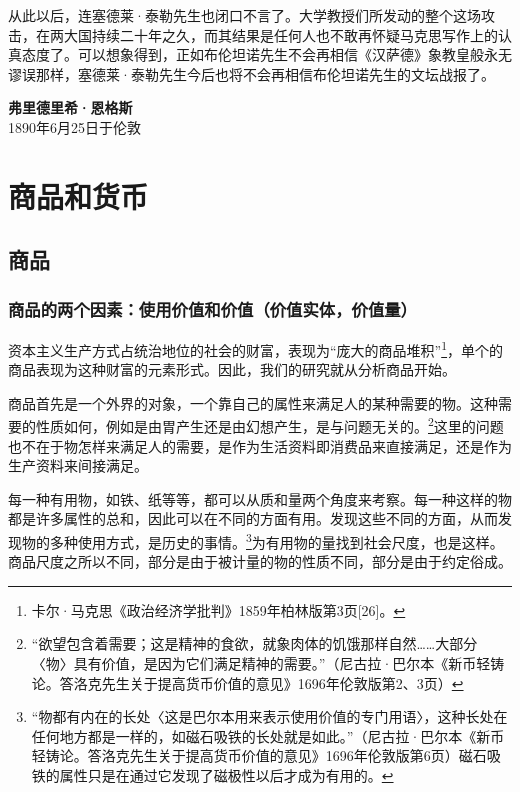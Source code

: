 \documentclass{ctexbook}
\begin{document}
从此以后，连塞德莱·泰勒先生也闭口不言了。大学教授们所发动的整个这场攻击，在两大国持续二十年之久，而其结果是任何人也不敢再怀疑马克思写作上的认真态度了。可以想象得到，正如布伦坦诺先生不会再相信《汉萨德》象教皇般永无谬误那样，塞德莱·泰勒先生今后也将不会再相信布伦坦诺先生的文坛战报了。



\begin{flushright}
    \textbf{弗里德里希·恩格斯}\\
    \small{1890年6月25日于伦敦}
\end{flushright}







\mainmatter

\part{商品和货币}
\thispagestyle{empty}

\chapter{商品}

    \section{商品的两个因素：使用价值和价值（价值实体，价值量）}

    资本主义生产方式占统治地位的社会的财富，表现为“庞大的商品堆积”\footnote{卡尔·马克思《政治经济学批判》1859年柏林版第3页[26]。}，单个的商品表现为这种财富的元素形式。因此，我们的研究就从分析商品开始。

    商品首先是一个外界的对象，一个靠自己的属性来满足人的某种需要的物。这种需要的性质如何，例如是由胃产生还是由幻想产生，是与问题无关的。\footnote{“欲望包含着需要；这是精神的食欲，就象肉体的饥饿那样自然……大部分〈物〉具有价值，是因为它们满足精神的需要。”（尼古拉·巴尔本《新币轻铸论。答洛克先生关于提高货币价值的意见》1696年伦敦版第2、3页）}这里的问题也不在于物怎样来满足人的需要，是作为生活资料即消费品来直接满足，还是作为生产资料来间接满足。

    每一种有用物，如铁、纸等等，都可以从质和量两个角度来考察。每一种这样的物都是许多属性的总和，因此可以在不同的方面有用。发现这些不同的方面，从而发现物的多种使用方式，是历史的事情。\footnote{“物都有内在的长处〈这是巴尔本用来表示使用价值的专门用语〉，这种长处在任何地方都是一样的，如磁石吸铁的长处就是如此。”（尼古拉·巴尔本《新币轻铸论。答洛克先生关于提高货币价值的意见》1696年伦敦版第6页）磁石吸铁的属性只是在通过它发现了磁极性以后才成为有用的。}为有用物的量找到社会尺度，也是这样。商品尺度之所以不同，部分是由于被计量的物的性质不同，部分是由于约定俗成。
\end{document}
